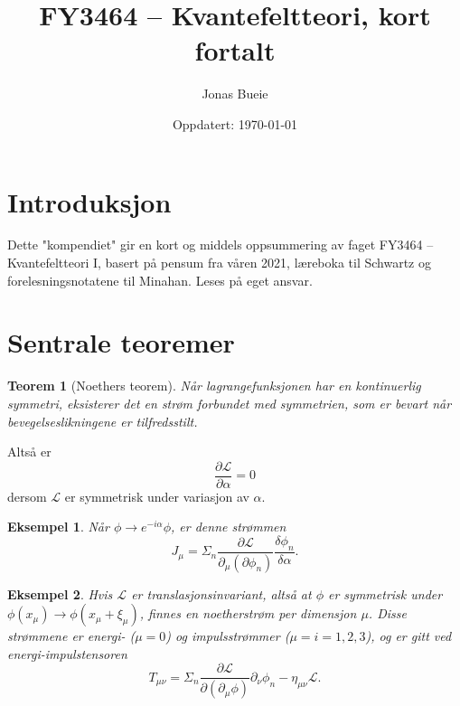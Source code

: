 \documentclass{article}
\title{FY3464 -- Kvantefeltteori, kort fortalt}
\author{Jonas Bueie}
\date{Oppdatert: \today}
\newtheorem{theorem}{Teorem}
\newtheorem{example}{Eksempel}
\renewcommand{\L}{\mathcal{L}}
\begin{document}
\maketitle

\tableofcontents

\section{Introduksjon}
Dette "kompendiet" gir en kort og middels oppsummering av faget FY3464 -- Kvantefeltteori I, basert på pensum fra våren 2021, læreboka til Schwartz og forelesningsnotatene til Minahan.
Leses på eget ansvar.


\section{Sentrale teoremer}
\begin{theorem}[Noethers teorem]
    Når lagrangefunksjonen har en kontinuerlig symmetri, eksisterer det en strøm forbundet med symmetrien, som er bevart når bevegelseslikningene er tilfredsstilt.
\end{theorem}

Altså er
\begin{equation*}
    \frac{\partial \L}{\partial \alpha} = 0
\end{equation*}
dersom $\L$ er symmetrisk under variasjon av $\alpha$.

\begin{example}
    Når $\phi \rightarrow e^{-i \alpha}\phi$, er denne strømmen
    \begin{equation*}
        J_\mu = \Sigma_n \frac{\partial \L}{\partial_\mu (\partial \phi_n)} \frac{\delta \phi_n}{\delta \alpha}.
    \end{equation*}
\end{example}

\begin{example}
    Hvis $\L$ er translasjonsinvariant, altså at $\phi$ er symmetrisk under $\phi(x_\mu) \rightarrow \phi(x_\mu + \xi_\mu)$, finnes en noetherstrøm per dimensjon $\mu$.
    Disse strømmene er energi- ($\mu = 0$) og impulsstrømmer ($\mu = i = 1, 2, 3$), og er gitt ved energi-impulstensoren
    \begin{equation*}
        T_{\mu \nu} = \Sigma_n \frac{\partial \L}{\partial (\partial_\mu \phi)} \partial_\nu \phi_n - \eta_{\mu \nu} \L.
    \end{equation*}
\end{example}
\end{document}
